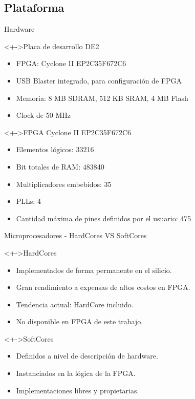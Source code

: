 \documentclass[xcolor=dvipsnames]{beamer}
\begin{document}
\subsection{Plataforma}
\begin{frame}{Hardware}
  \begin{block}<+->{Placa de desarrollo DE2} 	
    \begin{itemize}
      \scriptsize
     	\item FPGA: Cyclone II EP2C35F672C6
	\item USB Blaster integrado, para configuración de FPGA
	\item Memoria: 8 MB SDRAM, 512 KB SRAM, 4 MB Flash
	\item Clock de 50 MHz
     \end{itemize}
  \end{block}

  \begin{block}<+->{FPGA Cyclone II EP2C35F672C6} 	
    \begin{itemize}
      \scriptsize
     	\item Elementos lógicos: 33216
	\item Bit totales de RAM: 483840
	\item Multiplicadores embebidos: 35
	\item PLLs: 4
	\item Cantidad máxima de pines definidos por el usuario: 475
     \end{itemize}
  \end{block}
\end{frame}


\begin{frame}{Microprocesadores - HardCores VS SoftCores}
   \begin{block}<+->{HardCores}	
    \begin{itemize}
	\scriptsize
     	\item Implementados de forma permanente en el silicio.
	\item Gran rendimiento a expensas de altos costos en FPGA.
	\item Tendencia actual: HardCore incluido.
	\item No disponible en FPGA de este trabajo.
    \end{itemize}	
  \end{block}
  
  \begin{block}<+->{SoftCores}	
    \begin{itemize}
	\scriptsize
     	\item Definidos a nivel de descripción de hardware.
	\item Instanciados en la lógica de la FPGA.
	\item Implementaciones libres y propietarias.
    \end{itemize}	
  \end{block}
\end{frame}
\end{document}
